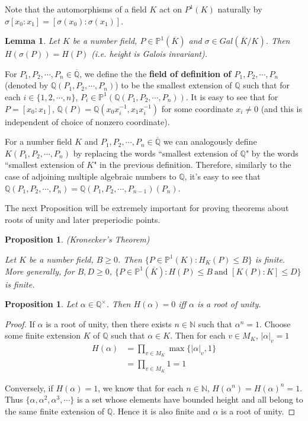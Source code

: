 \documentclass[12pt]{amsart}
\newtheorem{lem}[thm]{Lemma}
\newtheorem{prop}[thm]{Proposition}
\theoremstyle{definition}
\theoremstyle{remark}
\theoremstyle{definition}
\newcommand{\N}{\mathbb{N}}
\newcommand{\Q}{\mathbb{Q}}
\renewcommand{\P}{\mathbb{P}}
\begin{document}
Note that the automorphisms of a field $K$ act on $P^1(K)$ naturally by $\sigma[x_0:x_1] = [\sigma(x_0):\sigma(x_1)]$.

\begin{lem}
Let $K$ be a number field, $P \in \P^1(\overline{K})$ and $\sigma \in Gal(\overline{K}/K)$. Then $H(\sigma(P)) = H(P)$ (i.e. height is Galois invariant).
\end{lem}

For $P_1, P_2, \cdots, P_n \in \overline{\Q}$, we define the the \textbf{field of definition of $P_1, P_2, \cdots, P_n$} (denoted by $\Q(P_1, P_2, \cdots, P_n)$) to be the smallest extension of $\Q$ such that for each $i \in \{1,2, \cdots, n\}$, $P_i \in \P^1(\Q(P_1, P_2, \cdots, P_n))$. It is easy to see that for $P=[x_0:x_1]$, $\Q(P)=\Q(x_0x_i^{-1},x_1x_i^{-1})$ for some coordinate $x_i \neq 0$ (and this is independent of choice of nonzero coordinate).

For a number field $K$ and $P_1, P_2, \cdots, P_n \in \overline{\Q}$ we can analogously define $K(P_1, P_2, \cdots, P_n)$ by replacing the words ``smallest extension of $\Q$" by the words ``smallest extension of $K$" in the previous definition. Therefore, similarly to the case of adjoining multiple algebraic numbers to $\Q$, it's easy to see that $\Q(P_1,P_2, \cdots, P_n) = \Q (P_1,P_2, \cdots, P_{n-1})(P_n)$.

The next Proposition will be extremely important for proving theorems about roots of unity and later preperiodic points.

\begin{prop}{(Kronecker's Theorem)}

Let $K$ be a number field, $B \geq 0$. Then $\{P \in \P^1(K):H_K(P) \leq B\}$ is finite. More generally, for $B,D \geq 0$,  $\{P \in \P^1(\overline{K}):H(P) \leq B\ \text{and } [K(P):K] \leq D\}$ is finite.

\end{prop}

\begin{prop}

Let $\alpha \in \Q^{\times}$. Then $H(\alpha) = 0$ iff $\alpha$ is a root of unity. 

\end{prop}


\begin{proof}

If $\alpha$ is a root of unity, then there exists $n \in \N$ such that $\alpha^n = 1$. Choose some finite extension $K$ of $\Q$ such that $\alpha \in K$.   
Then for each $v \in M_K$, $|\alpha|_v = 1$
\begin{align*}
H(\alpha) 
&= \prod_{v \in M_K} \max\{|\alpha|_v,1\}\\
&= \prod_{v \in M_K} 1 = 1
\end{align*}

Conversely, if $H(\alpha)=1$, we know that for each $n \in \N$, $H(\alpha^n) = H(\alpha)^n = 1$. Thus $\{\alpha, \alpha^2, \alpha^3, \cdots\}$ is a set whose elements have bounded height and all belong to the same finite extension of $\Q$. Hence it is also finite and $\alpha$ is a root of unity.

\end{proof}
\end{document}
